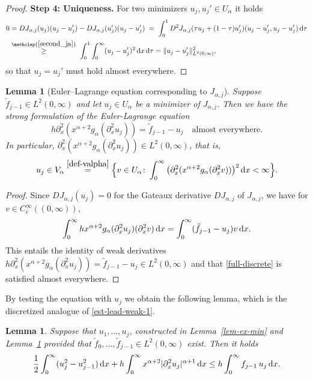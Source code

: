 \documentclass[reqno,12pt]{amsart}
\renewcommand{\d}{\ensuremath{\mathrm{d}}}
\renewcommand{\d}{\ensuremath{{\rm d}}}
\newtheorem{lemma}[theorem]{Lemma}
\numberwithin{equation}{section}
\begin{document}
\begin{proof}
%
\bigskip
%

\textbf{Step 4: Uniqueness. } 
For two minimizers $u_j, u_j' \in U_\alpha$ it holds
%
\begin{align*}
0 &= D J_{\alpha,j}(u_j)(u_j - u_j') - D J_{\alpha,j}(u_j')(u_j - u_j') \; = \; \int_0^1 D^2 J_{\alpha,j}(\tau u_j + (1-\tau) u_j') (u_j-u_j',u_j-u_j') \, \d \tau \\
&\stackrel{\mathclap{\eqref{second_ja}}}{\ge} \; \int_0^1 \int_0^\infty (u_j - u_j')^2 \, \d x \, \d \tau = \|u_j - u_j'\|_{L^2(0,\infty)}^2,
\end{align*}
%
so that $u_j = u_j'$ must hold almost everywhere.
\end{proof}
%

%
\begin{lemma}[Euler--Lagrange equation corresponding to $J_{\alpha,j}$] \label{lem:Euler-Lagrange_J}
Suppose $\tilde f_{j-1} \in L^2(0,\infty)$ and let $u_j \in U_\alpha$ be a minimizer of $J_{\alpha,j}$. Then we have the strong formulation of the Euler-Lagrange equation
%
\begin{equation} \label{eq:Euler-Lagrange_I}
     h\partial_x^2 (x^{\alpha+2} g_\alpha(\partial_x^2 u_j)) = \tilde f_{j-1} - u_j \quad \text{almost everywhere.}
\end{equation}
%
In particular, $\partial_x^2 (x^{\alpha+2} g_\alpha(\partial_x^2 u_j)) \in L^2(0,\infty)$, that is,
%
\[
u_j \in V_\alpha \stackrel{\eqref{def-valpha}}{=} \Big\{v \in U_\alpha \colon \int_0^\infty \big(\partial_x^2 (x^{\alpha+2} g_\alpha(\partial_x^2 v))\big)^2 \, \d x < \infty\Big\}.
\]
%
\end{lemma}
%

%
\begin{proof}
Since $D J_{\alpha,j}(u_j) = 0$ for the Gateaux derivative $D J_{\alpha,j}$ of $J_{\alpha,j}$, we have for $v \in C^\infty_\mathrm{c}((0,\infty))$,
%
\[
\int_0^\infty h x^{\alpha+2} g_\alpha(\partial_x^2 u_j) (\partial_x^2 v) \, \d x = \int_0^\infty (\tilde f_{j-1} - u_j) v \, \d x.
\]
%
This entails the identity of weak derivatives $h\partial_x^2 (x^{\alpha+2} g_\alpha(\partial_x^2 u_j)) = \tilde f_{j-1} - u_j \in L^2(0,\infty)$  and that \eqref{full-discrete} is satisfied almost everywhere.
\end{proof}
%

By testing the equation with $u_j$ we obtain the following lemma, which is the discretized analogue of \eqref{est-lead-weak-1}.
%
\begin{lemma}\label{lem-lead-weak-discrete}
Suppose that $u_1,\ldots,u_j$, constructed in Lemma~\ref{lem-ex-min} and Lemma~\ref{lem:Euler-Lagrange_J} provided that $\tilde f_0,\ldots, \tilde f_{j-1} \in L^2(0,\infty)$ exist. Then it holds
%
\begin{equation}\label{est-lead-weak-discrete-ineq}
    \frac{1}{2} \int_0^\infty (u_j^2-u_{j-1}^2)\, \d x 
    + h \int_0^\infty x^{\alpha+2} |\partial_x^2 u_j|^{\alpha+1}\, \d x
    \leq
    h \int_0^\infty f_{j-1}\, u_j\, \d x.
\end{equation}
%
\end{lemma}
%
\end{document}
